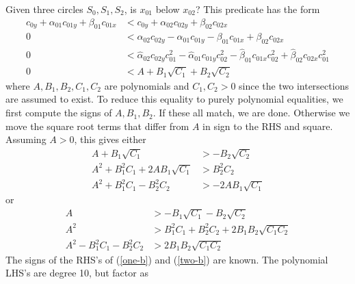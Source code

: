 \documentclass[11pt]{article}
\newcommand{\halpha}{\hat{\alpha}}
\newcommand{\hbeta}{\hat{\beta}}
\begin{document}
Given three circles $S_0,S_1,S_2$, is $x_{01}$ below $x_{02}$?  This predicate has the form
\begin{align*}
c_{0y} + \alpha_{01} c_{01y} + \beta_{01} c_{01x} &< c_{0y} + \alpha_{02} c_{02y} + \beta_{02} c_{02x} \\
0 &< \alpha_{02} c_{02y} - \alpha_{01} c_{01y} - \beta_{01} c_{01x} + \beta_{02} c_{02x} \\
0 &< \halpha_{02} c_{02y} c_{01}^2 - \halpha_{01} c_{01y} c_{02}^2 - \hbeta_{01} c_{01x} c_{02}^2+ \hbeta_{02} c_{02x} c_{01}^2 \\
0 &< A + B_1 \sqrt{C_1} + B_2 \sqrt{C_2}
\end{align*}
where $A,B_1,B_2,C_1,C_2$ are polynomials and $C_1, C_2 > 0$ since the two intersections are assumed to exist.  To reduce this equality to
purely polynomial equalities, we first compute the signs of $A, B_1, B_2$.  If these all match, we are done.  Otherwise we move the square root
terms that differ from $A$ in sign to the RHS and square.  Assuming $A > 0$, this gives either
\begin{align}
A + B_1 \sqrt{C_1} &> -B_2 \sqrt{C_2} \nonumber \\
A^2 + B_1^2 C_1 + 2 A B_1 \sqrt{C_1} &> B_2^2 C_2 \nonumber \\
A^2 + B_1^2 C_1 - B_2^2 C_2 &> -2 A B_1 \sqrt{C_1} \label{one-b}
\end{align}
or
\begin{align}
A &> -B_1 \sqrt{C_1} - B_2 \sqrt{C_2} \nonumber \\
A^2 &> B_1^2 C_1 + B_2^2 C_2 + 2 B_1 B_2 \sqrt{C_1 C_2} \nonumber \\
A^2 - B_1^2 C_1 - B_2^2 C_2 &> 2 B_1 B_2 \sqrt{C_1 C_2} \label{two-b}
\end{align}
The signs of the RHS's of (\ref{one-b}) and (\ref{two-b}) are known.  The polynomial LHS's are degree 10, but factor as
\end{document}
